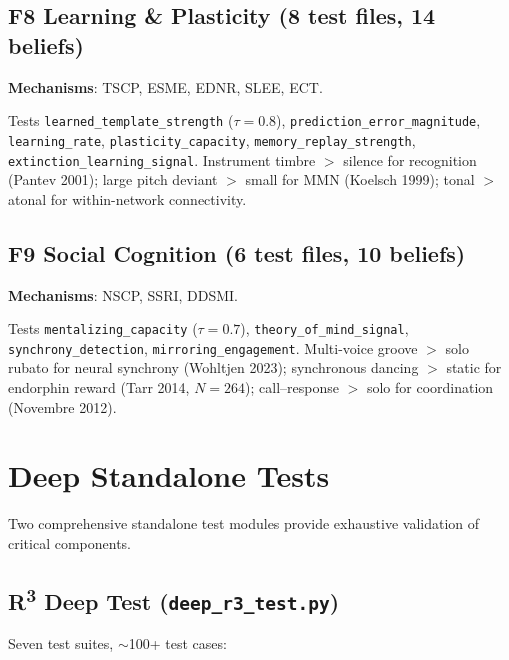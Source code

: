 \documentclass[10pt,twocolumn]{article}
\newcommand{\Rthree}{R\textsuperscript{3}}
\newcommand{\fn}[1]{\textbf{F#1}}
\newcommand{\belief}[1]{\texttt{#1}}
\begin{document}
\subsection{\fn{8} Learning \& Plasticity (8 test files, 14 beliefs)}

\textbf{Mechanisms}: TSCP, ESME, EDNR, SLEE, ECT.

Tests \belief{learned\_template\_strength} ($\tau\!=\!0.8$), \belief{prediction\_error\_magnitude}, \belief{learning\_rate}, \belief{plasticity\_capacity}, \belief{memory\_replay\_strength}, \belief{extinction\_learning\_signal}. Instrument timbre $>$ silence for recognition (Pantev 2001); large pitch deviant $>$ small for MMN (Koelsch 1999); tonal $>$ atonal for within-network connectivity.

\subsection{\fn{9} Social Cognition (6 test files, 10 beliefs)}

\textbf{Mechanisms}: NSCP, SSRI, DDSMI.

Tests \belief{mentalizing\_capacity} ($\tau\!=\!0.7$), \belief{theory\_of\_mind\_signal}, \belief{synchrony\_detection}, \belief{mirroring\_engagement}. Multi-voice groove $>$ solo rubato for neural synchrony (Wohltjen 2023); synchronous dancing $>$ static for endorphin reward (Tarr 2014, $N\!=\!264$); call--response $>$ solo for coordination (Novembre 2012).

\section{Deep Standalone Tests}
\label{sec:deep}

Two comprehensive standalone test modules provide exhaustive validation of critical components.

\subsection{\Rthree{} Deep Test (\texttt{deep\_r3\_test.py})}

Seven test suites, $\sim$100+ test cases:
\end{document}
